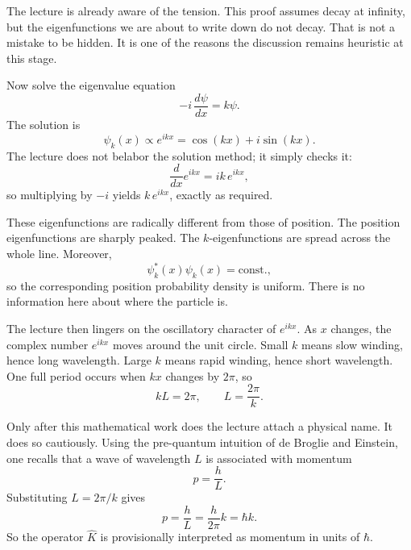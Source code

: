 The lecture is already aware of the tension. This proof assumes decay at infinity, but the eigenfunctions we are about to write down do not decay. That is not a mistake to be hidden. It is one of the reasons the discussion remains heuristic at this stage.

Now solve the eigenvalue equation
\begin{equation}
-i\,\frac{d\psi}{dx}=k\psi.
\end{equation}
The solution is
\begin{equation}
\psi_k(x)\propto e^{ikx}=\cos(kx)+i\sin(kx).
\end{equation}
The lecture does not belabor the solution method; it simply checks it:
\begin{equation}
\frac{d}{dx}e^{ikx}=ik\,e^{ikx},
\end{equation}
so multiplying by \(-i\) yields \(k\,e^{ikx}\), exactly as required.

These eigenfunctions are radically different from those of position. The position eigenfunctions are sharply peaked. The \(k\)-eigenfunctions are spread across the whole line. Moreover,
\begin{equation}
\psi_k^*(x)\psi_k(x)=\text{const.},
\end{equation}
so the corresponding position probability density is uniform. There is no information here about where the particle is.

The lecture then lingers on the oscillatory character of \(e^{ikx}\). As \(x\) changes, the complex number \(e^{ikx}\) moves around the unit circle. Small \(k\) means slow winding, hence long wavelength. Large \(k\) means rapid winding, hence short wavelength. One full period occurs when \(kx\) changes by \(2\pi\), so
\begin{equation}
kL=2\pi,
\qquad
L=\frac{2\pi}{k}.
\end{equation}

Only after this mathematical work does the lecture attach a physical name. It does so cautiously. Using the pre-quantum intuition of de Broglie and Einstein, one recalls that a wave of wavelength \(L\) is associated with momentum
\begin{equation}
p=\frac{h}{L}.
\end{equation}
Substituting \(L=2\pi/k\) gives
\begin{equation}
p=\frac{h}{L}=\frac{h}{2\pi}k=\hbar k.
\end{equation}
So the operator \(\hat K\) is provisionally interpreted as momentum in units of \(\hbar\).

